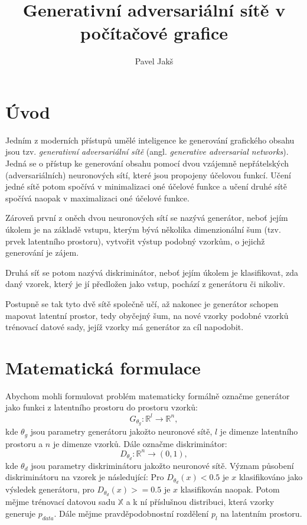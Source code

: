 \documentclass[czech]{article}
\title{Generativní adversariální sítě v počítačové grafice}
\author{Pavel Jakš}
\begin{document}

\maketitle

\section*{Úvod}

Jedním z moderních přístupů umělé inteligence ke generování grafického obsahu jsou tzv. \emph{generativní adversariální sítě}
(angl. \emph{generative adversarial networks}).
Jedná se o přístup ke generování obsahu pomocí dvou vzájemně nepřátelských (adversariálních) neuronových sítí,
které jsou propojeny účelovou funkcí.
Učení jedné sítě potom spočívá v minimalizaci oné účelové funkce a učení druhé sítě spočívá naopak v maximalizaci oné účelové funkce.

Zároveň první z oněch dvou neuronových sítí se nazývá generátor, neboť jejím úkolem je na základě vstupu,
kterým bývá několika dimenzionální šum (tzv. prvek latentního prostoru),
vytvořit výstup podobný vzorkům, o jejichž generování je zájem.

Druhá síť se potom nazývá diskriminátor, neboť jejím úkolem je klasifikovat, zda daný vzorek,
který je jí předložen jako vstup, pochází z generátoru či nikoliv.

Postupně se tak tyto dvě sítě společně učí, až nakonec je generátor schopen mapovat latentní prostor, tedy obyčejný šum,
na nové vzorky podobné vzorků trénovací datové sady, jejíž vzorky má generátor za cíl napodobit.

\section{Matematická formulace}

Abychom mohli formulovat problém matematicky formálně označme generátor jako funkci z latentního prostoru do prostoru vzorků:
\begin{equation}
    G_{\theta_g} : \mathbb{R}^l \rightarrow \mathbb{R}^n,
\end{equation}
kde $\theta_g$ jsou parametry generátoru jakožto neuronové sítě, $l$ je dimenze latentního prostoru a $n$ je dimenze vzorků.
Dále označme diskriminátor:
\begin{equation}
    D_{\theta_d} : \mathbb{R}^n \rightarrow (0,1),
\end{equation}
kde $\theta_d$ jsou parametry diskriminátoru jakožto neuronové sítě.
Význam působení diskriminátoru na vzorek je následující:
Pro $D_{\theta_d}(x) < 0.5$ je $x$ klasifikováno jako výsledek generátoru,
pro $D_{\theta_d}(x) >= 0.5$ je $x$ klasifikován naopak.
Potom mějme trénovací datovou sadu $\mathbb{X}$ a k ní příslušnou distribuci, která vzorky generuje $p_{data}$.
Dále mějme pravděpodobnostní rozdělení $p_l$ na latentním prostoru.
\end{document}
